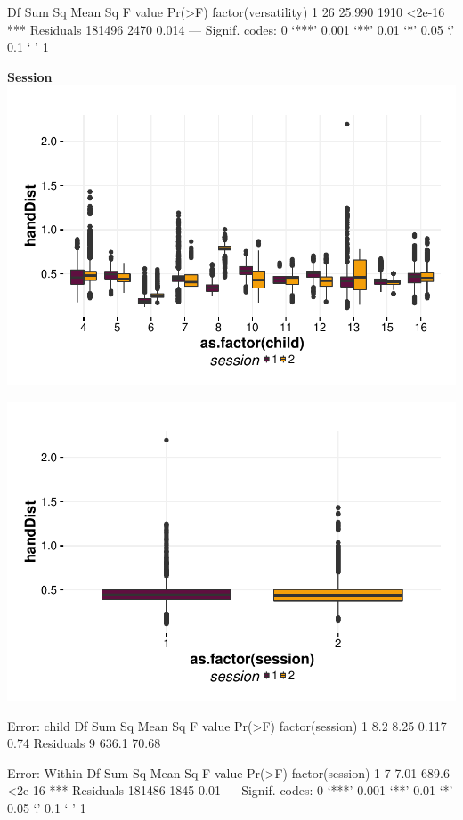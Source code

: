\documentclass{article}
\begin{document}
\begin{Schunk}
\begin{Soutput}
                        Df Sum Sq Mean Sq F value Pr(>F)    
factor(versatility)      1     26  25.990    1910 <2e-16 ***
Residuals           181496   2470   0.014                   
---
Signif. codes:  0 ‘***’ 0.001 ‘**’ 0.01 ‘*’ 0.05 ‘.’ 0.1 ‘ ’ 1
\end{Soutput}
\end{Schunk}


\textbf{Session}
\includegraphics{features-plot_handdistance_child_session_quiz}

\includegraphics{features-plot_handdistance_session_quiz}

\begin{Schunk}
\begin{Soutput}
Error: child
                Df Sum Sq Mean Sq F value Pr(>F)
factor(session)  1    8.2    8.25   0.117   0.74
Residuals        9  636.1   70.68               

Error: Within
                    Df Sum Sq Mean Sq F value Pr(>F)    
factor(session)      1      7    7.01   689.6 <2e-16 ***
Residuals       181486   1845    0.01                   
---
Signif. codes:  0 ‘***’ 0.001 ‘**’ 0.01 ‘*’ 0.05 ‘.’ 0.1 ‘ ’ 1
\end{Soutput}
\end{Schunk}
\end{document}
